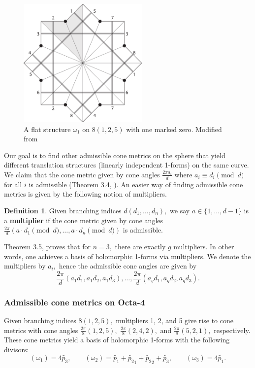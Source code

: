 \documentclass[12pt,reqno]{amsart}
\theoremstyle{definition}
\newtheorem{defn}{Definition}
\theoremstyle{remark}
\begin{document}
\begin{figure}[htbp]
   \centering
   \includegraphics[width=2.5in]{figures/125_flat.pdf} 
  \caption{A flat structure $\omega_1$ on $8(1, 2, 5)$ with one marked zero. Modified from \cite{dami}}
  \label{fig:125_flat}
\end{figure}

Our goal is to find other admissible cone metrics on the sphere that yield different translation structures (linearly independent 1-forms) on the same curve. We claim that the cone metric given by cone angles $\frac{2 \pi a_i}{d}$ where $a_i \equiv d_i \pmod d$ for all $i$ is admissible (Theorem 3.4, \cite{dthesis}). An easier way of finding admissible cone metrics is given by the following notion of multipliers.

\begin{defn} Given branching indices $d (d_1, \ldots , d_n),$ we say $a \in \{1, \ldots, d - 1\}$ is a \textbf{multiplier} if the cone metric given by cone angles $\frac{2 \pi}{d} (a \cdot d_1 \pmod d, \ldots , a \cdot d_n \pmod d)$ is admissible. 
\end{defn}

Theorem 3.5, \cite{dthesis} proves that for $n = 3,$ there are exactly $g$ multipliers. In other words, one achieves a basis of holomorphic 1-forms via multipliers. We denote the multipliers by $a_i,$ hence the admissible cone angles are given by $$\frac{2\pi}{d}(a_1 d_1, a_1 d_2, a_1 d_3), \ldots , \frac{2\pi}{d}(a_g d_1, a_g d_2, a_g d_3).$$ 

\subsubsection*{Admissible cone metrics on Octa-4} Given branching indices $8 (1, 2, 5),$ multipliers 1, 2, and 5 give rise to cone metrics with cone angles $\frac{2 \pi}{8}(1, 2, 5),$ $\frac{2 \pi}{8}(2, 4, 2),$ and $\frac{2 \pi}{8}(5, 2, 1),$ respectively. These cone metrics yield a basis of holomorphic 1-forms with the following divisors: $$(\omega_1) = 4 \widetilde{p_3}, \qquad (\omega_2) = \widetilde{p_1} + \widetilde{p_2}_1 + \widetilde{p_2}_2 + \widetilde{p_3}, \qquad (\omega_3) = 4 \widetilde{p_1}.$$
\end{document}
